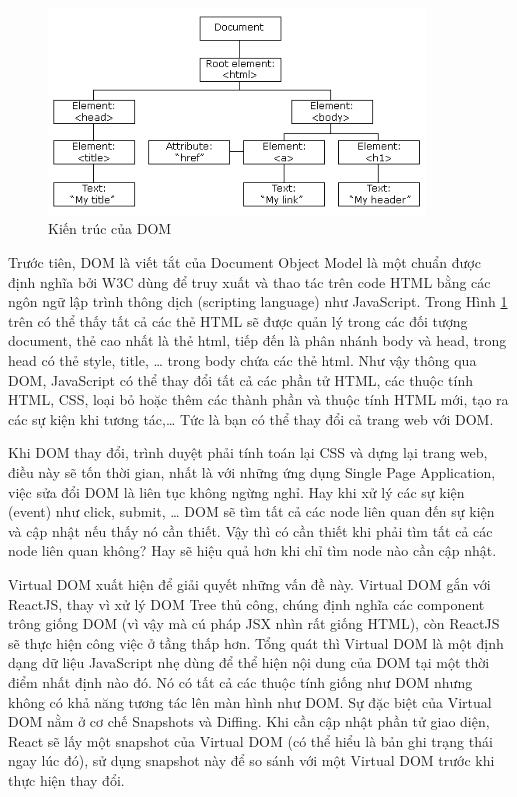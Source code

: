 \begin{figure}[H]
\centering
\includegraphics[width=10cm]{images/DOM.png}
\caption{Kiến trúc của DOM}
\label{fig:dom}
\end{figure}

Trước tiên, DOM là viết tắt của Document Object Model là
một chuẩn được định nghĩa bởi W3C dùng để truy xuất và thao
tác trên code HTML bằng các ngôn ngữ lập trình thông dịch
(scripting language) như JavaScript.
Trong Hình \ref{fig:dom}
trên có thể thấy tất cả các thẻ HTML sẽ được quản lý trong
các đối tượng document, thẻ cao nhất là thẻ html, tiếp đến là
phân nhánh body và head, trong head có thẻ style, title, … trong body
chứa các thẻ html. Như vậy thông qua DOM, JavaScript có thể thay
đổi tất cả các phần tử HTML, các thuộc tính HTML, CSS, loại
bỏ hoặc thêm các thành phần và thuộc tính HTML mới, tạo ra các sự
kiện khi tương tác,… Tức là bạn có thể thay đổi cả trang web với DOM.

Khi DOM thay đổi, trình duyệt phải tính toán lại CSS và dựng lại
trang web, điều này sẽ tốn thời gian, nhất là với những ứng dụng
Single Page Application, việc sửa đổi DOM là liên tục không ngừng
nghỉ. Hay khi xử lý các sự kiện (event) như click, submit, …
DOM sẽ tìm tất cả các node liên quan đến sự kiện và cập nhật nếu
thấy nó cần thiết. Vậy thì có cần thiết khi phải tìm tất
cả các node liên quan không? Hay sẽ hiệu quả hơn khi chỉ tìm
node nào cần cập nhật.

Virtual DOM xuất hiện để giải quyết những vấn đề này.
Virtual DOM gắn với ReactJS, thay vì xử lý DOM Tree thủ công,
chúng định nghĩa các component trông giống DOM
(vì vậy mà cú pháp JSX nhìn rất giống HTML), còn ReactJS sẽ thực
hiện công việc ở tầng thấp hơn. Tổng quát thì Virtual DOM là
một định dạng dữ liệu JavaScript nhẹ dùng để thể hiện nội dung
của DOM tại một thời điểm nhất định nào đó. Nó có tất cả các thuộc
tính giống như DOM nhưng không có khả năng tương tác lên màn hình như
DOM. Sự đặc biệt của Virtual DOM nằm ở cơ chế Snapshots và Diffing.
Khi cần cập nhật phần tử giao diện, React sẽ lấy một snapshot của Virtual
DOM (có thể hiểu là bản ghi trạng thái ngay lúc đó),
sử dụng snapshot này để so sánh với một Virtual DOM trước
khi thực hiện thay đổi.

